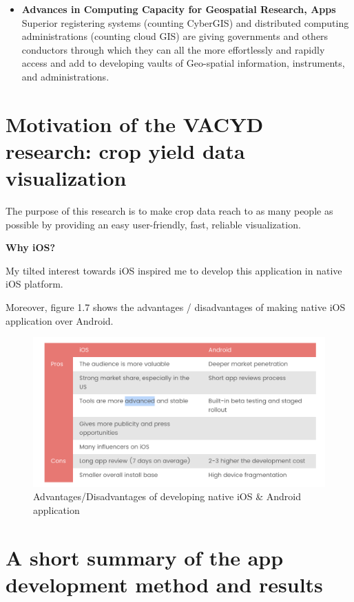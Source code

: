 \begin{itemize}
  \item  \textbf{Advances in Computing Capacity for Geospatial Research, Apps} \\
 Superior registering systems (counting CyberGIS) and distributed computing administrations (counting cloud GIS) are giving governments and others conductors through which they can all the more effortlessly and rapidly access and add to developing vaults of Geo-spatial information, instruments, and administrations.
  
\end{itemize}

\section{Motivation of the VACYD research: crop yield data visualization}

The purpose of this research is to make crop data reach to as many people as possible by providing an easy user-friendly, fast, reliable visualization.


\textbf{Why \gls{iOS}?}


My tilted interest towards \gls{iOS} inspired me to develop this application in native \gls{iOS} platform.

Moreover, figure 1.7 shows the advantages / disadvantages of making native \gls{iOS} application over Android.

  \begin{figure}[H]
            \centering
            \includegraphics[width=0.8\linewidth]{figures/ch1/iosVSandroid.png}
            \caption{\label{fig:future_work_distribution} Advantages/Disadvantages of developing native iOS \& Android application \cite{theAPPsolutions}}
  \end{figure}


\section{A short summary of the app development method and results}

